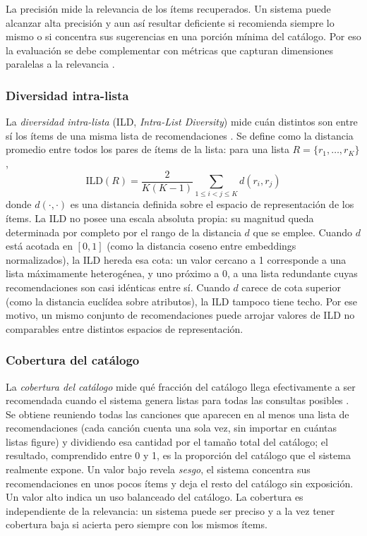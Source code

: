 La precisión mide la relevancia de los ítems recuperados. Un sistema puede alcanzar alta precisión y aun así resultar deficiente si recomienda siempre lo mismo o si concentra sus sugerencias en una porción mínima del catálogo. Por eso la evaluación se debe complementar con métricas que capturan dimensiones paralelas a la relevancia \parencite{kaminskas_2016_beyond}.

\subsubsection*{Diversidad intra-lista}

La \textit{diversidad intra-lista} (ILD, \textit{Intra-List Diversity}) mide cuán distintos son entre sí los ítems de una misma lista de recomendaciones \parencite{ziegler_2005_topic_diversification}. Se define como la distancia promedio entre todos los pares de ítems de la lista: para una lista $R = \{r_1, \ldots, r_K\}$,
\begin{equation}
    \text{ILD}(R) = \frac{2}{K(K-1)} \sum_{1 \leq i < j \leq K} d(r_i, r_j)
    \label{eq:ild}
\end{equation}
\noindent donde $d(\cdot,\cdot)$ es una distancia definida sobre el espacio de representación de los ítems. La ILD no posee una escala absoluta propia: su magnitud queda determinada por completo por el rango de la distancia $d$ que se emplee. Cuando $d$ está acotada en $[0,1]$ (como la distancia coseno entre embeddings normalizados), la ILD hereda esa cota: un valor cercano a 1 corresponde a una lista máximamente heterogénea, y uno próximo a 0, a una lista redundante cuyas recomendaciones son casi idénticas entre sí. Cuando $d$ carece de cota superior (como la distancia euclídea sobre atributos), la ILD tampoco tiene techo. Por ese motivo, un mismo conjunto de recomendaciones puede arrojar valores de ILD no comparables entre distintos espacios de representación.

\subsubsection*{Cobertura del catálogo}

La \textit{cobertura del catálogo} mide qué fracción del catálogo llega efectivamente a ser recomendada cuando el sistema genera listas para todas las consultas posibles \parencite{kaminskas_2016_beyond}. Se obtiene reuniendo todas las canciones que aparecen en al menos una lista de recomendaciones (cada canción cuenta una sola vez, sin importar en cuántas listas figure) y dividiendo esa cantidad por el tamaño total del catálogo; el resultado, comprendido entre 0 y 1, es la proporción del catálogo que el sistema realmente expone. Un valor bajo revela \textit{sesgo}, el sistema concentra sus recomendaciones en unos pocos ítems y deja el resto del catálogo sin exposición. Un valor alto indica un uso balanceado del catálogo. La cobertura es independiente de la relevancia: un sistema puede ser preciso y a la vez tener cobertura baja si acierta pero siempre con los mismos ítems.



